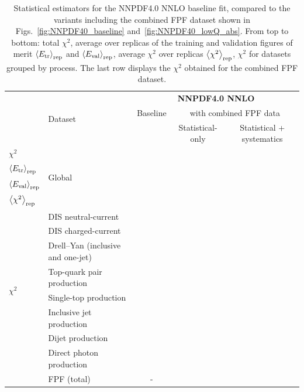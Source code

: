 \begin{table}[!t]
  \centering
  \footnotesize
  \renewcommand{\arraystretch}{1.30}
  \begin{tabularx}{\textwidth}{X|l|c|c|c}
  \toprule
  & \multirow{3}{*}{Dataset}
  & \multicolumn{3}{c}{\bf NNPDF4.0 NNLO} \\
  &
  & Baseline
  & \multicolumn{2}{c}{with combined FPF data}  \\
  &
  &
  & Statistical-only  & Statistical + systematics  \\
  \midrule
  $\chi^2$ &  \multirow{4}{*}{Global}      &  &    &  \\
  $\left\langle E_{\rm tr}\right\rangle_{\rm rep}$
  & &    &     &   \\
  $\left\langle E_{\rm val}\right\rangle_{\rm rep}$
  & &     &     & \\
  $\left\langle \chi^2\right\rangle_{\rm rep}$
  & &      &        &   \\
  \midrule
  \multirow{8}{*}{$\chi^2$}
  & DIS neutral-current                     &      &       &      \\
  & DIS charged-current                     &     &       &      \\
  & Drell--Yan (inclusive and one-jet) &     &       &      \\
  & Top-quark pair production               &     &       &      \\
  & Single-top production                   &     &       &      \\
  & Inclusive jet production                &     &       &      \\
  & Dijet production                        &     &       &      \\
  & Direct photon production                 &    &       &      \\
  & FPF (total)                 &  -  &       &      \\
  \bottomrule
\end{tabularx}
\vspace{0.2cm}
\caption{\small Statistical estimators for the NNPDF4.0 NNLO
  baseline fit, compared to the variants including
  the combined FPF dataset shown in Figs.~\ref{fig:NNPDF40_baseline}
  and~\ref{fig:NNPDF40_lowQ_abs}.
  From top to bottom: total $\chi^2$, average
  over replicas of the training and validation figures of merit
  $\left\langle E_{\rm tr}\right\rangle_{\rm rep}$ and $\left\langle E_{\rm val}\right\rangle_{\rm rep}$,
  average $\chi^2$ over replicas $\left\langle \chi^2\right\rangle_{\rm rep}$,
  $\chi^2$ for datasets grouped by process.
  The last row displays the $\chi^2$ obtained for the combined FPF dataset.
  \label{tab:chi2_nnpdf40_baseline}
}
\end{table}

